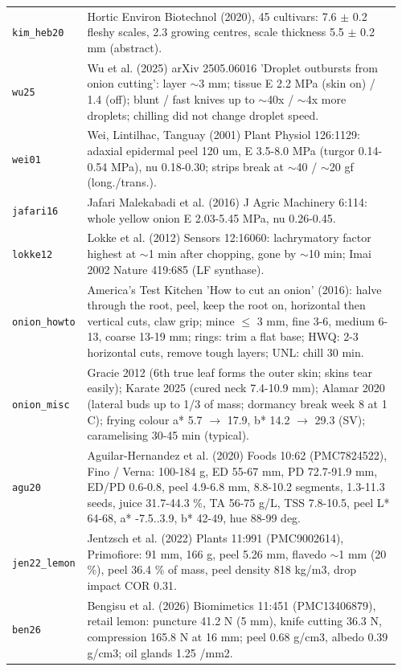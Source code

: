 \documentclass[10.5pt,a4paper]{article}
\begin{document}
{\begin{longtable}{@{}p{0.16\linewidth}p{0.8\linewidth}@{}}
\texttt{kim\_\allowbreak{}heb20} & Hortic Environ Biotechnol (2020), 45 cultivars: 7.6 $\pm$ 0.2 fleshy scales, 2.3 growing centres, scale thickness 5.5 $\pm$ 0.2 mm (abstract). \\
\texttt{wu25} & Wu et al. (2025) arXiv 2505.06016 'Droplet outbursts from onion cutting': layer $\sim$3 mm; tissue E 2.2 MPa (skin on) / 1.4 (off); blunt / fast knives up to $\sim$40x / $\sim$4x more droplets; chilling did not change droplet speed. \\
\texttt{wei01} & Wei, Lintilhac, Tanguay (2001) Plant Physiol 126:1129: adaxial epidermal peel 120 um, E 3.5-8.0 MPa (turgor 0.14-0.54 MPa), nu 0.18-0.30; strips break at $\sim$40 / $\sim$20 gf (long./trans.). \\
\texttt{jafari16} & Jafari Malekabadi et al. (2016) J Agric Machinery 6:114: whole yellow onion E 2.03-5.45 MPa, nu 0.26-0.45. \\
\texttt{lokke12} & Lokke et al. (2012) Sensors 12:16060: lachrymatory factor highest at $\sim$1 min after chopping, gone by $\sim$10 min; Imai 2002 Nature 419:685 (LF synthase). \\
\texttt{onion\_\allowbreak{}howto} & America's Test Kitchen 'How to cut an onion' (2016): halve through the root, peel, keep the root on, horizontal then vertical cuts, claw grip; mince $\le$ 3 mm, fine 3-6, medium 6-13, coarse 13-19 mm; rings: trim a flat base; HWQ: 2-3 horizontal cuts, remove tough layers; UNL: chill 30 min. \\
\texttt{onion\_\allowbreak{}misc} & Gracie 2012 (6th true leaf forms the outer skin; skins tear easily); Karate 2025 (cured neck 7.4-10.9 mm); Alamar 2020 (lateral buds up to 1/3 of mass; dormancy break week 8 at 1 C); frying colour a* 5.7 $\to$ 17.9, b* 14.2 $\to$ 29.3 (SV); caramelising 30-45 min (typical). \\
\texttt{agu20} & Aguilar-Hernandez et al. (2020) Foods 10:62 (PMC7824522), Fino / Verna: 100-184 g, ED 55-67 mm, PD 72.7-91.9 mm, ED/PD 0.6-0.8, peel 4.9-6.8 mm, 8.8-10.2 segments, 1.3-11.3 seeds, juice 31.7-44.3 \%, TA 56-75 g/L, TSS 7.8-10.5, peel L* 64-68, a* -7.5..3.9, b* 42-49, hue 88-99 deg. \\
\texttt{jen22\_\allowbreak{}lemon} & Jentzsch et al. (2022) Plants 11:991 (PMC9002614), Primofiore: 91 mm, 166 g, peel 5.26 mm, flavedo $\sim$1 mm (20 \%), peel 36.4 \% of mass, peel density 818 kg/m3, drop impact COR 0.31. \\
\texttt{ben26} & Bengisu et al. (2026) Biomimetics 11:451 (PMC13406879), retail lemon: puncture 41.2 N (5 mm), knife cutting 36.3 N, compression 165.8 N at 16 mm; peel 0.68 g/cm3, albedo 0.39 g/cm3; oil glands 1.25 /mm2. \\

\end{longtable}}
\end{document}

